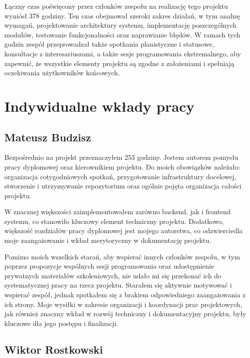 Łączny czas poświęcony przez członków zespołu na realizację tego projektu wyniósł 378 godziny.
Ten czas obejmował szeroki zakres działań, w tym analizę wymagań, projektowanie architektury systemu, implementację poszczególnych modułów, testowanie funkcjonalności oraz naprawianie błędów.
W ramach tych godzin zespół przeprowadzał także spotkania planistyczne i statusowe, konsultacje z interesariuszami, a także sesje programowania ekstremalnego, aby zapewnić, że wszystkie elementy projektu są zgodne z założeniami i spełniają oczekiwania użytkowników końcowych.

\section{Indywidualne wkłady pracy}
\label{sec:indywidualne-wklady-pracy}

\subsection{Mateusz Budzisz}
\label{subsec:mateusz-budzisz}

Bezpośrednio na projekt przeznaczyłem 253 godziny.
Jestem autorem pomysłu pracy dyplomowej oraz kierownikiem projektu.
Do moich obowiązków należało: organizacja cotygodniowych spotkań, przygotowanie infrastruktury docelowej, stworzenie i utrzymywanie repozytorium oraz ogólnie pojęta organizacja całości projektu.

W znacznej większości zaimplementowałem zarówno backend, jak i frontend systemu, co stanowiło kluczowy element techniczny projektu.
Dodatkowo, większość rozdziałów pracy dyplomowej jest mojego autorstwa, co odzwierciedla moje zaangażowanie i wkład merytoryczny w dokumentację projektu.

Pomimo moich wszelkich starań, aby wspierać innych członków zespołu, w tym poprzez propozycje wspólnych sesji programowania oraz udostępnienie prywatnych materiałów szkoleniowych, nie udało mi się przekonać ich do systematycznej pracy na rzecz projektu.
Starałem się aktywnie motywować i wspierać zespół, jednak spotkałem się z brakiem odpowiedniego zaangażowania z ich strony.
Moje wysiłki w zakresie organizacji i koordynacji prac projektowych, jak również znaczny wkład w rozwój techniczny i dokumentacyjny projektu, były kluczowe dla jego postępu i finalizacji.

\subsection{Wiktor Rostkowski}
\label{subsec:wiktor-rostkowski}

